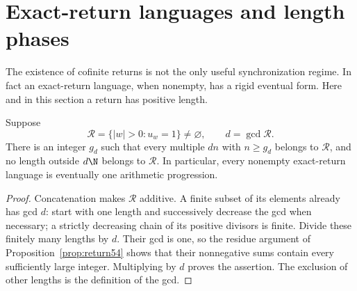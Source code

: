 \section{Exact-return languages and length phases}\label{sec:phases55}
The existence of cofinite returns is not the only useful synchronization regime. In fact an exact-return language, when nonempty, has a rigid eventual form. Here and in this section a return has positive length.

\begin{lemma}\label{lem:returnperiod55}
Suppose
\[
 \mathcal R=\{|w|>0:u_w=1\}\ne\varnothing,
 \qquad d=\gcd\mathcal R.
\]
There is an integer $g_d$ such that every multiple $dn$ with $n\ge g_d$ belongs to $\mathcal R$, and no length outside $d\N$ belongs to $\mathcal R$. In particular, every nonempty exact-return language is eventually one arithmetic progression.
\end{lemma}
\begin{proof}
Concatenation makes $\mathcal R$ additive. A finite subset of its elements already has gcd $d$: start with one length and successively decrease the gcd when necessary; a strictly decreasing chain of its positive divisors is finite. Divide these finitely many lengths by $d$. Their gcd is one, so the residue argument of Proposition~\ref{prop:return54} shows that their nonnegative sums contain every sufficiently large integer. Multiplying by $d$ proves the assertion. The exclusion of other lengths is the definition of the gcd.
\end{proof}

